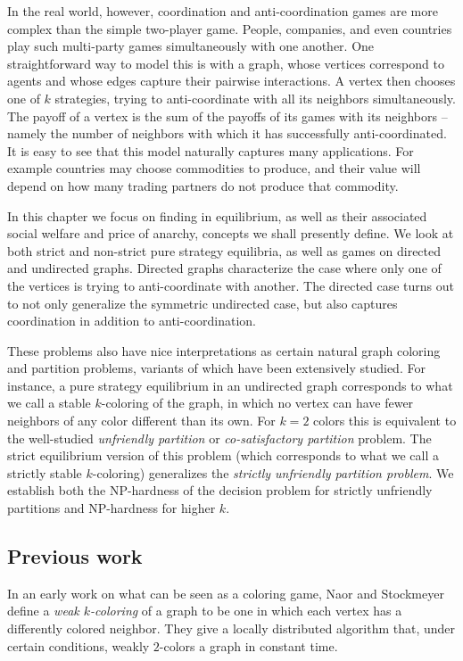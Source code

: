 In the real world, however, coordination and anti-coordination games are more
complex than the simple two-player game.  People, companies, and even countries
play such multi-party games simultaneously with one another. One
straightforward way to model this is with a graph, whose vertices correspond to
agents and whose edges capture their pairwise interactions.  A vertex then
chooses one of $k$ strategies, trying to anti-coordinate with all its neighbors
simultaneously.  The payoff of a vertex is the sum of the payoffs of its games
with its neighbors -- namely the number of neighbors with which it has
successfully anti-coordinated.  It is easy to see that this model naturally
captures many applications.  For example countries may choose commodities to
produce, and their value will depend on how many trading partners do not
produce that commodity.

In this chapter we focus on finding  in equilibrium, as
well as their associated social welfare and price of anarchy, concepts we shall
presently define.  We look at both strict and non-strict  pure strategy
equilibria, as well as games on directed and undirected graphs.  Directed
graphs characterize the case where only one of the vertices is trying to
anti-coordinate with another.  The directed case turns out to not only
generalize the symmetric undirected case, but also captures coordination in
addition to anti-coordination.

These problems also have nice interpretations as certain natural graph coloring
and partition problems, variants of which have been extensively studied.  For
instance, a pure strategy equilibrium in an undirected graph corresponds to
what we call a stable $k$-coloring of the graph, in which no vertex can have
fewer neighbors of any color different than its own.  For $k=2$ colors this is
equivalent to the well-studied \emph{unfriendly partition} or
\emph{co-satisfactory partition} problem.  The strict equilibrium version of
this problem (which corresponds to what we call a strictly stable $k$-coloring)
generalizes the \emph{strictly unfriendly partition problem}. We establish both
the NP-hardness of the decision problem for strictly unfriendly partitions and
NP-hardness for higher $k$.

\subsection{Previous work}

In an early work on what can be seen as a coloring game, Naor and
Stockmeyer~\cite{NaorS93} define a \emph{weak $k$-coloring} of a graph to be
one in which each vertex has a differently colored neighbor.  They give a
locally distributed algorithm that, under certain conditions, weakly $2$-colors
a graph in constant time. 


